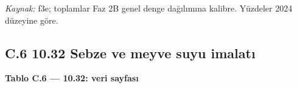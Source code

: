 \endgroup

\emph{Kaynak:} \etiketT{} f3e; toplamlar Faz 2B genel denge dağılımına kalibre. Yüzdeler 2024 düzeyine göre.

\hypertarget{nace_kartlar_10-12-c6-1032-sebze-ve-meyve-suyu-imalatux131}{%
\subsection{C.6 10.32 Sebze ve meyve suyu imalatı}\label{nace_kartlar_10-12-c6-1032-sebze-ve-meyve-suyu-imalatux131}}


\textbf{Tablo C.6 --- 10.32: veri sayfası}

\nopagebreak[4]

\begingroup\gbtablo\small

